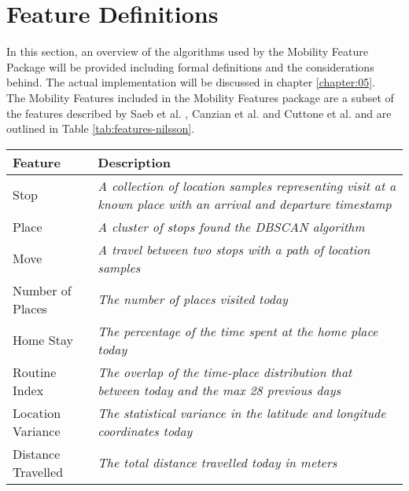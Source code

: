 \section{Feature Definitions}
\label{section:definitions}
In this section, an overview of the algorithms used by the Mobility Feature Package will be provided including formal definitions and the considerations behind. The actual implementation will be discussed in chapter \ref{chapter:05}.\\

The Mobility Features included in the Mobility Features package are a subset of the features described by Saeb et al. \cite{Saeb2015}, Canzian et al. \cite{Canzian2015} and Cuttone et al. \cite{sparse-location-2014} and are outlined in Table \ref{tab:features-nilsson}.

\begin{table}[h]
    \centering
    \begin{tabular}{|p{}|p{}|}
    \hline
    \textbf{Feature}   & \textbf{Description}                                                                                                  \\ \hline
    Stop               & \textit{A collection of location samples representing visit at a known place with an arrival and departure timestamp} \\ \hline
    Place              & \textit{A cluster of stops found the DBSCAN algorithm}                                                                \\ \hline
    Move               & \textit{A travel between two stops with a path of location samples}                                                   \\ \hline
    Number of Places   & \textit{The number of places visited today}                                                                           \\ \hline
    Home Stay          & \textit{The percentage of the time spent at the home place today}                                                     \\ \hline
    Routine Index      & \textit{The overlap of the time-place distribution that between today and the max 28 previous days}                   \\ \hline
    Location Variance  & \textit{The statistical variance in the latitude and longitude coordinates today}                                     \\ \hline
    Distance Travelled & \textit{The total distance travelled today in meters}                                                                 \\ \hline

\end{tabular}
\end{table}
